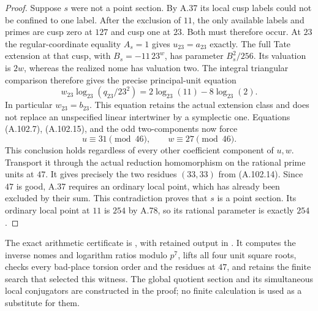 \begin{proof}
Suppose $s$ were not a point section.
By A.37 its local cusp labels could not be
confined to one label.  After the exclusion of
$11$, the only available labels and primes
are cusp zero at $127$ and cusp one at $23$.
Both must therefore occur.
At $23$ the regular-coordinate equality
$A_s=1$ gives $u_{23}=a_{23}$ exactly.
The full Tate extension at that cusp, with
$B_s=-11\,23^w$, has parameter $B_s^2/256$.
Its valuation is $2w$, whereas the realized
nome has valuation two.  The integral triangular
comparison therefore gives the precise principal-unit
equation
\[
      w_{23}\log_{23}(q_{23}/23^2)
                 =2\log_{23}(11)-8\log_{23}(2).
\tag{A.102.18}
\]
In particular $w_{23}=b_{23}$.
This equation retains the actual extension
class and does not replace an unspecified
linear intertwiner by a symplectic one.
Equations (A.102.7), (A.102.15), and the
odd two-components now force
\[
                 u\equiv31\pmod{46},\qquad
                 w\equiv27\pmod{46}.
\tag{A.102.19}
\]
This conclusion holds regardless of every
other coefficient component of $u,w$.
Transport it through the actual reduction
homomorphism on the rational prime units at
$47$.  It gives precisely the two residues
$(33,33)$ from (A.102.14).
Since $47$ is good, A.37 requires an ordinary
local point, which has already been excluded
by their sum.
This contradiction proves that $s$ is a
point section.  Its ordinary local point
at $11$ is $254$ by A.78, so its rational
parameter is exactly $254$.
\end{proof}

The exact arithmetic certificate is
,
with retained output in
.
It computes the inverse nomes and logarithm ratios
modulo $p^7$, lifts all four unit square roots,
checks every bad-place torsion order and the
residues at $47$, and retains the finite search
that selected this witness.
The global quotient section and its simultaneous
local conjugators are constructed in the proof;
no finite calculation is used as a substitute for them.
